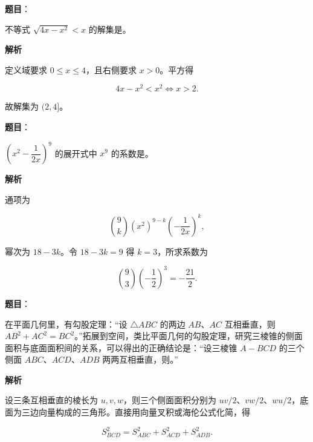 \begin{answer}

\textbf{题目}：

不等式 $\sqrt{4x-x^2}<x$ 的解集是\gkblank{}。

\textbf{解析}

定义域要求 $0\leqslant x\leqslant4$，且右侧要求 $x>0$。平方得

\nopagebreak[4]
\[
4x-x^2<x^2
\Longleftrightarrow x>2.
\]

故解集为 $(2,4]$。

\gkanswer{答案：$(2,4]$}

\end{answer}
\begin{answer}

\textbf{题目}：

$\left(x^2-\dfrac1{2x}\right)^9$ 的展开式中 $x^9$ 的系数是\gkblank{}。

\textbf{解析}

通项为

\nopagebreak[4]
\[
\binom9k(x^2)^{9-k}\left(-\frac1{2x}\right)^k,
\]

幂次为 $18-3k$。令 $18-3k=9$ 得 $k=3$，所求系数为

\nopagebreak[4]
\[
\binom93\left(-\frac12\right)^3=-\frac{21}{2}.
\]


\end{answer}
\begin{answer}

\textbf{题目}：

在平面几何里，有勾股定理：“设 $\triangle ABC$ 的两边 $AB\text{、}AC$ 互相垂直，则 $AB^2+AC^2=BC^2$。”拓展到空间，类比平面几何的勾股定理，研究三棱锥的侧面面积与底面面积间的关系，可以得出的正确结论是：“设三棱锥 $A-BCD$ 的三个侧面 $ABC\text{、}ACD\text{、}ADB$ 两两互相垂直，则\gkblank{}。”

\textbf{解析}

设三条互相垂直的棱长为 $u,v,w$，则三个侧面面积分别为 $uv/2\text{、}vw/2\text{、}wu/2$，底面为三边向量构成的三角形。直接用向量叉积或海伦公式化简，得

\nopagebreak[4]
\[
S_{BCD}^2=S_{ABC}^2+S_{ACD}^2+S_{ADB}^2.
\]


\end{answer}
